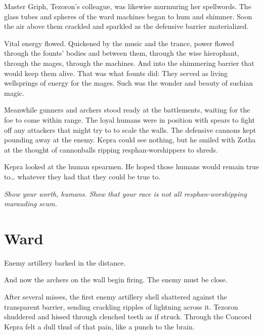 \documentclass
  [a4paper,
   12pt,
   oneside
  ]%
  {article}
\begin{document}
Master Griph, Tezoron's colleague, was likewise murmuring her spellwords. 
The glass tubes and spheres of the ward machines began to hum and shimmer. Soon the air above them crackled and sparkled as the defensive barrier materialized.

Vital energy flowed. 
Quickened by the music and the trance, power flowed through the founts' bodies and between them, through the wise hierophant, through the mages, through the machines. And into the shimmering barrier that would keep them alive. 
That was what founts did: They served as living wellsprings of energy for the mages.
Such was the wonder and beauty of suchian magic.

Meanwhile gunners and archers stood ready at the battlements, waiting for the foe to come within range. 
The loyal humans were in position with spears to fight off any attackers that might try to to scale the walls. 
The defensive cannons kept pounding away at the enemy. Kepra could see nothing, but he smiled with Zotha at the thought of cannonballs ripping resphan-worshippers to shreds.


Kepra looked at the human spearmen. He hoped those humans would remain true to… whatever they had that they could be true to. 

\emph{Show your worth, humans. Show that your race is not all resphan-worshipping marauding scum.}



\section{Ward}
Enemy artillery barked in the distance.

And now the archers on the wall begin firing. The enemy must be close.

After several misses, the first enemy artillery shell shattered against the transparent barrier, sending crackling ripples of lightning across it. Tezoron shuddered and hissed through clenched teeth as if struck. Through the Concord Kepra felt a dull thud of that pain, like a punch to the brain. 
\end{document}

